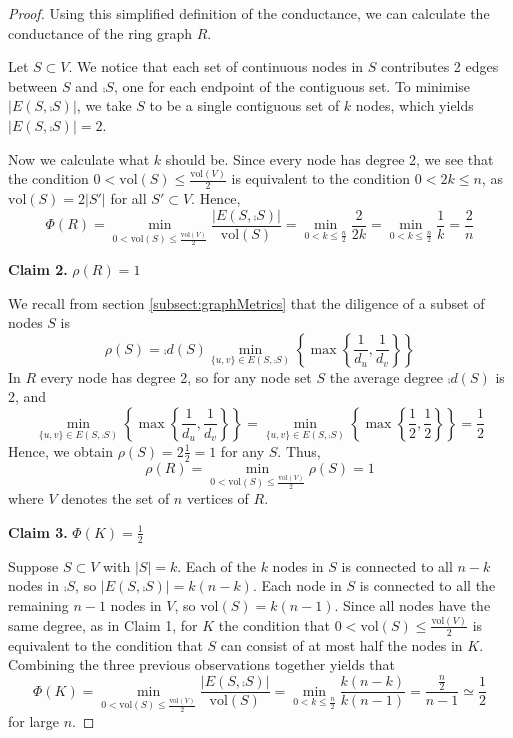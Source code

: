 \begin{proof}
Using this simplified definition of the conductance, we can calculate the conductance of the ring graph $R$. 

Let $S \subset V$.  We notice that each set of continuous nodes in $S$ contributes 2 edges between $S$ and $\comp{S}$, one for each endpoint of the contiguous set. %
To minimise $|E(S, \comp{S})|$, we take $S$ to be a single contiguous set of $k$ nodes, which yields $|E(S, \comp{S})| = 2$. 

Now we calculate what $k$ should be. Since every node has degree 2, we see that the condition $0 < \text{vol}(S) \leq \frac{\text{vol}(V)}{2}$ is equivalent to the condition $0 < 2k \leq n$, as $\text{vol}(S) = 2|S'|$ for all $S' \subset V$. Hence,
$$
	\Phi(R) 
	=\min_{0 < \text{vol}(S) \leq \frac{\text{vol}(V)}{2}} \frac{|E(S, \comp{S})|}{\text{vol}(S)} 
	= \min_{0 < k \leq \frac{n}{2}} \frac{2}{2k} 
	= \min_{0 < k \leq \frac{n}{2}} \frac{1}{k} 
	= \frac{2}{n}
$$

\textbf{Claim 2.} $\rho(R)=1$

We recall from section \ref{subsect:graphMetrics} that the diligence of a subset of nodes $S$ is
$$
\rho(S) = \comp{d}(S) \min_{\{u, v\} \in E(S, \comp{S}) } \left\{ \max \left\{ \frac{1}{d_u},\frac{1}{d_v} \right\} \right\}
$$ 
In $R$ every node has degree 2, so for any node set $S$ the average degree $\comp{d}(S)$ is 2, and 
$$
	\min_{\{u, v\} \in E(S, \comp{S}) } \left\{ \max \left\{ \frac{1}{d_u},\frac{1}{d_v} \right\} \right\}
	= 
	\min_{\{u, v\} \in E(S, \comp{S}) } \left\{ \max \left\{ \frac{1}{2},\frac{1}{2} \right\} \right\}
	=
	\frac{1}{2}
$$
Hence, we obtain $\rho(S) = 2 \frac{1}{2} = 1$ for any $S$. Thus, 
$$
	\rho(R) =  \min_{0 < \text{vol}(S) \leq \frac{\text{vol}(V)}{2}} \rho(S) = 1 
$$
where $V$ denotes the set of $n$ vertices of $R$.

\textbf{Claim 3.}  $\Phi(K)=\frac{1}{2}$

Suppose $S \subset V$ with $|S| = k$. Each of the $k$ nodes in $S$ is connected to all $n - k$ nodes in $\comp{S}$, so $|E(S, \comp{S})| = k(n - k)$. Each node in $S$ is connected to all the remaining $n - 1$ nodes in $V$, so $\text{vol}(S) = k(n-1)$. Since all nodes have the same degree, as in Claim 1, for $K$ the condition that $0 < \text{vol}(S) \leq \frac{\text{vol}(V)}{2}$ is equivalent to the condition that $S$ can consist of at most half the nodes in $K$. Combining the three previous observations together yields that
$$
	\Phi(K) = \min_{0 < \text{vol}(S) \leq \frac{\text{vol}(V)}{2}} \frac{|E(S, \comp{S})|}{\text{vol}(S)} 
	= \min_{0 < k \leq \frac{n}{2}} \frac{k(n-k)}{k(n-1)} 
	= \frac{\frac{n}{2}}{n-1}
	\simeq \frac{1}{2}
$$
for large $n$.


\end{proof}
